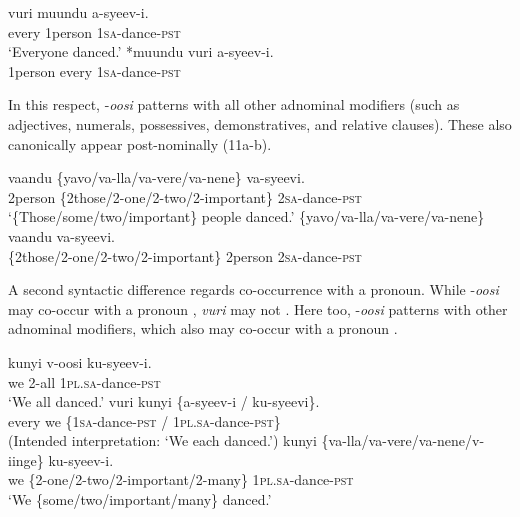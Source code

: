 \documentclass[output=paper]{langsci/langscibook}
\begin{document}
\ea\label{ex:landman:10}
\ea
\gll vuri    muundu  a-syeev-i.    \\
     every    1person  1\textsc{sa}-dance-\textsc{pst}       \\
\glt ‘Everyone danced.’
\ex\label{ex:landman:10b}
\gll \textup{*}muundu  vuri    a-syeev-i.  \\
     1person    every    1\textsc{sa}-dance-\textsc{pst}    \\
\z
\z

In this respect, -\textit{oosi} patterns with all other adnominal modifiers (such as adjectives, numerals, possessives, demonstratives, and relative clauses). These also canonically appear post-nominally (11a-b). 

\ea\label{ex:landman:11}
\ea
\gll vaandu  \{yavo/va-lla/va-vere/va-nene\}    va-syeevi.  \\
     2person  \{2those/2-one/2-two/2-important\} 2\textsc{sa}-dance-\textsc{pst}\\
\glt ‘\{Those/some/two/important\} people danced.’
\ex\label{ex:landman:11b}
\gll *\{yavo/va-lla/va-vere/va-nene\}  vaandu   va-syeevi.\\
     \{2those/2-one/2-two/2-important\}  2person  2\textsc{sa}-dance-\textsc{pst}\\
\z
\z

A second syntactic difference regards co-occurrence with a pronoun. While -\textit{oosi} may co-occur with a pronoun , \textit{vuri} may not . Here too, -\textit{oosi} patterns with other adnominal modifiers, which also may co-occur with a pronoun .

\newpage 

\ea\label{ex:landman:12}
\ea\label{ex:landman:12a}
\gll kunyi  v-oosi    ku-syeev-i.      \\
     we  2-all    1\textsc{pl}.\textsc{sa}-dance-\textsc{pst}\\
\glt ‘We all danced.'
\ex\label{ex:landman:12b}
\gll *vuri  kunyi    \{a-syeev-i / ku-syeevi\}.  \\
     every  we    \{1\textsc{sa}-dance-\textsc{pst} / 1\textsc{pl}.\textsc{sa}-dance-\textsc{pst\}}\\
\glt (Intended interpretation: ‘We each danced.’)
\ex\label{ex:landman:12c}
\gll kunyi \{va-lla/va-vere/va-nene/v-iinge\}     ku-syeev-i.\\
     we    \{2-one/2-two/2-important/2-many\} 1\textsc{pl}.\textsc{sa}-dance-\textsc{pst}\\
\glt ‘We \{some/two/important/many\} danced.’
\z
\z
\end{document}
